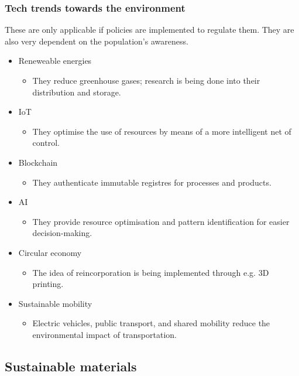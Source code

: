 \documentclass{article}
\begin{document}
\subsubsection*{Tech trends towards the environment}

These are only applicable if policies are implemented to regulate them. They are
also very dependent on the population's awareness.

\begin{itemize}
    \item Reneweable energies
    \begin{itemize}
        \item They reduce greenhouse gases; research is being done into their
        distribution and storage.
    \end{itemize}
    \item IoT
    \begin{itemize}
        \item They optimise the use of resources by means of a more intelligent
        net of control.
    \end{itemize}
    \item Blockchain
    \begin{itemize}
        \item They authenticate immutable registres for processes and products.
    \end{itemize}
    \item AI
    \begin{itemize}
        \item They provide resource optimisation and pattern identification for
        easier decision-making.
    \end{itemize}
    \item Circular economy
    \begin{itemize}
        \item The idea of reincorporation is being implemented through e.g. 3D
        printing.
    \end{itemize}
    \item Sustainable mobility
    \begin{itemize}
        \item Electric vehicles, public transport, and shared mobility reduce
        the environmental impact of transportation.
    \end{itemize}
\end{itemize}

\subsection*{Sustainable materials}
\end{document}
